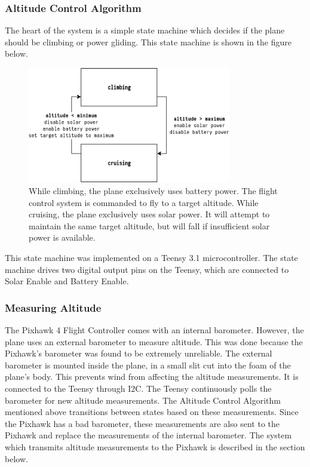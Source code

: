 \documentclass[12pt,journal,compsoc]{IEEEtran}
\begin{document}
\subsubsection{Altitude Control Algorithm}
The heart of the system is a simple state machine which decides if the plane should be climbing or power gliding. This state machine is shown in the figure below. 

\begin{figure}[h!]
\hspace*{0cm}
\centering
\includegraphics[width=3.5in]{altitude_state_machine.png}
\caption{While climbing, the plane exclusively uses battery power. The flight control system is commanded to fly to a target altitude. While cruising, the plane exclusively uses solar power. It will attempt to maintain the same target altitude, but will fall if insufficient solar power is available.}
\label{altitude_state_machine}
\end{figure}

This state machine was implemented on a Teensy 3.1 microcontroller. The state machine drives two digital output pins on the Teensy, which are connected to Solar Enable and Battery Enable. 

\subsubsection{Measuring Altitude}
The Pixhawk 4 Flight Controller comes with an internal barometer. However, the plane uses an external barometer to measure altitude. This was done because the Pixhawk's barometer was found to be extremely unreliable. The external barometer is mounted inside the plane, in a small slit cut into the foam of the plane's body. This prevents wind from affecting the altitude measurements. It is connected to the Teensy through I2C. The Teensy continuously polls the barometer for new altitude measurements. The Altitude Control Algorithm mentioned above transitions between states based on these measurements. Since the Pixhawk has a bad barometer, these measurements are also sent to the Pixhawk and replace the measurements of the internal barometer. The system which transmits altitude measurements to the Pixhawk is described in the section below.
\end{document}
